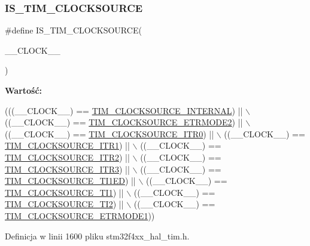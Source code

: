 \subsubsection{\texorpdfstring{I\+S\+\_\+\+T\+I\+M\+\_\+\+C\+L\+O\+C\+K\+S\+O\+U\+R\+CE}{IS\_TIM\_CLOCKSOURCE}}
{\footnotesize\ttfamily \#define I\+S\+\_\+\+T\+I\+M\+\_\+\+C\+L\+O\+C\+K\+S\+O\+U\+R\+CE(\begin{DoxyParamCaption}\item[{}]{\+\_\+\+\_\+\+C\+L\+O\+C\+K\+\_\+\+\_\+ }\end{DoxyParamCaption})}

{\bfseries Wartość\+:}
\begin{DoxyCode}
(((\_\_CLOCK\_\_) == \hyperlink{group___t_i_m___clock___source_ga9b398a201d8b6a4f200ebde86b1d8f3a}{TIM\_CLOCKSOURCE\_INTERNAL}) || \(\backslash\)
                                       ((\_\_CLOCK\_\_) == \hyperlink{group___t_i_m___clock___source_gab133f0839cf6a4e858457d48f057eea8}{TIM\_CLOCKSOURCE\_ETRMODE2}) ||
       \(\backslash\)
                                       ((\_\_CLOCK\_\_) == \hyperlink{group___t_i_m___clock___source_ga3310aa84f2f322eb77538997c070e56a}{TIM\_CLOCKSOURCE\_ITR0})     || \(\backslash\)
                                       ((\_\_CLOCK\_\_) == \hyperlink{group___t_i_m___clock___source_gae2da814f8d86491e7c344bb8d0f62b96}{TIM\_CLOCKSOURCE\_ITR1})     || \(\backslash\)
                                       ((\_\_CLOCK\_\_) == \hyperlink{group___t_i_m___clock___source_gafb779719a41769b14303da4977f6a5f1}{TIM\_CLOCKSOURCE\_ITR2})     || \(\backslash\)
                                       ((\_\_CLOCK\_\_) == \hyperlink{group___t_i_m___clock___source_ga0cce2af04ad903ba683515c3772abb27}{TIM\_CLOCKSOURCE\_ITR3})     || \(\backslash\)
                                       ((\_\_CLOCK\_\_) == \hyperlink{group___t_i_m___clock___source_gad8c96337acf40356d82570cc4851ce2d}{TIM\_CLOCKSOURCE\_TI1ED})    || \(\backslash\)
                                       ((\_\_CLOCK\_\_) == \hyperlink{group___t_i_m___clock___source_ga0a8708d4dab5cbd557a76efb362e13c0}{TIM\_CLOCKSOURCE\_TI1})      || \(\backslash\)
                                       ((\_\_CLOCK\_\_) == \hyperlink{group___t_i_m___clock___source_ga7950cf616702dd38d8f1ab5091efc012}{TIM\_CLOCKSOURCE\_TI2})      || \(\backslash\)
                                       ((\_\_CLOCK\_\_) == \hyperlink{group___t_i_m___clock___source_gaa7743af6f4b8869cad0375526c6145ce}{TIM\_CLOCKSOURCE\_ETRMODE1}))
\end{DoxyCode}


Definicja w linii 1600 pliku stm32f4xx\+\_\+hal\+\_\+tim.\+h.

